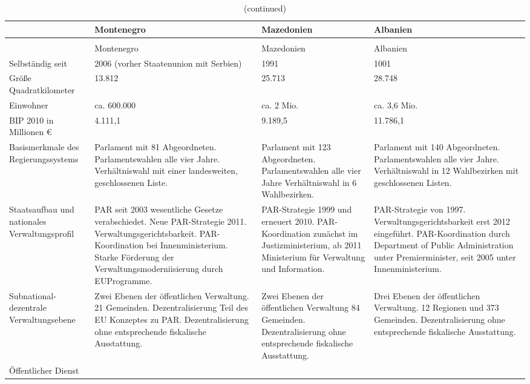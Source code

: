 \begin{longtable}[H]{|L{24mm}|C{34mm}|C{34mm}|C{34mm}|}
\caption[Schematische Darstellung zur Verwaltungsentwicklung der Untersuchungsländer ]{Schematische Darstellung zur Verwaltungsentwicklung der Untersuchungsländer }\\\hline
&Montenegro&Mazedonien&Albanien\\\hline
\endfirsthead
\caption[]{(continued)}\\\hline
&Montenegro&Mazedonien&Albanien\\\hline
\endhead 
\hline
\endfoot
\hline
\endlastfoot
Selbständig seit&2006 (vorher Staatenunion mit Serbien)&1991&1001\\\hline
Größe Quadratkilometer&13.812&25.713&28.748\\\hline
Einwohner &ca. 600.000&ca. 2 Mio.&ca. 3,6 Mio.\\\hline
BIP 2010 in Millionen \euro{}&4.111,1&9.189,5&11.786,1\\\hline
Basismerkmale des Regierungssystems&
Parlament mit 81 Abgeordneten. 
Parlamentswahlen alle vier Jahre.
Verhältniswahl mit einer landesweiten, geschlossenen Liste.&
Parlament mit 123 Abgeordneten.
Parlamentswahlen alle vier Jahre
Verhältniswahl in 6 Wahlbezirken.&
Parlament mit 140 Abgeordneten.
Parlamentswahlen alle vier Jahre.
Verhältniswahl in 12 Wahlbezirken mit geschlossenen Listen.\\\hline
Staatsaufbau und nationales Verwaltungsprofil&
PAR seit 2003 wesentliche Gesetze verabschiedet.
Neue PAR-Strategie 2011.
Verwaltungsgerichtsbarkeit.
PAR-Koordination bei Innenministerium.
Starke Förderung der Verwaltungsmoderniisierung durch EUProgramme.&
PAR-Strategie 1999 und erneuert 2010.
PAR-Koordination zunächst im Justizministerium, ab 2011 Ministerium für Verwaltung und Information.&
PAR-Strategie von 1997.
Verwaltungsgerichtsbarkeit erst 2012 eingeführt.
PAR-Koordination durch Department of Public Administration 
unter Premierminister,
seit 2005 unter Innenministerium.\\\hline
Subnational-dezentrale Verwaltungsebene&
Zwei Ebenen der öffentlichen Verwaltung.
21 Gemeinden.
Dezentralisierung Teil des EU Konzeptes zu PAR.
Dezentralisierung ohne entsprechende fiskalische Ausstattung. &
Zwei Ebenen der öffentlichen Verwaltung
 84 Gemeinden.
Dezentralisierung ohne entsprechende fiskalische Ausstattung. &
Drei Ebenen der öffentlichen Verwaltung.
12 Regionen und 373 Gemeinden.
Dezentralisierung ohne entsprechende fiskalische Ausstattung. \\\hline
Öffentlicher Dienst&

\end{longtable}
